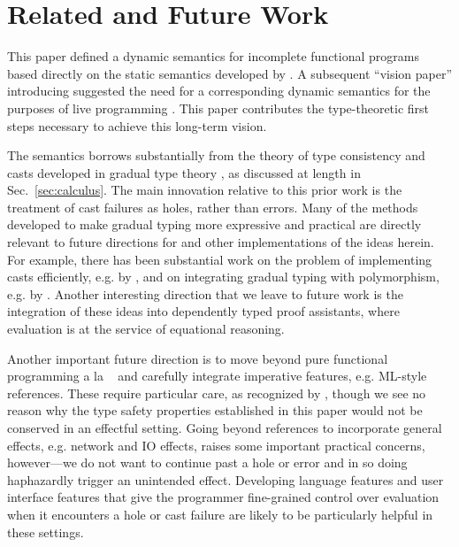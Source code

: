 \newcommand{\relatedWorkSection}{Related and Future Work}
\section{\protect\relatedWorkSection} %
\label{sec:relatedWork}

This paper defined a dynamic semantics for incomplete functional programs
based directly on the static semantics developed by \citet{popl-paper}.
A subsequent ``vision paper'' introducing \Hazel suggested the need for 
a corresponding dynamic semantics for the purposes of live programming \cite{HazelnutSNAPL}. 
This paper    
contributes the type-theoretic first steps necessary to achieve this long-term vision.

The semantics borrows substantially
from the theory of type consistency and casts developed in gradual type theory \cite{Siek06a,DBLP:conf/snapl/SiekVCB15}, as discussed
at length in Sec.~\ref{sec:calculus}. The main innovation relative to this
prior work is the treatment of cast failures as holes, rather than errors.
Many of the methods developed to make gradual typing more expressive and practical are directly relevant to future directions for \Hazel and other implementations of the ideas herein. For example, there has been substantial work on the problem of implementing casts efficiently, e.g. by \citet{herman2010space}, and on integrating gradual typing with polymorphism, e.g. by \cite{garcia2015principal}. Another interesting direction that we leave to future work is the integration of these ideas into dependently typed proof assistants, 
where evaluation is at the service of equational reasoning.

Another important future direction is to move beyond
pure functional programming a la \Elm~ and carefully integrate imperative features, e.g. ML-style references. These require particular care, as recognized by \cite{Siek06a}, though we see no reason why the type safety properties  established in this paper would not be conserved in an effectful setting. Going beyond references to incorporate general effects, e.g. network and IO effects, raises some important practical concerns, however---we do not want to continue past a hole or error and in so doing haphazardly trigger an unintended effect. Developing language features and user interface features that give the programmer fine-grained control over evaluation when it encounters a hole or cast failure are likely to be particularly helpful in these settings.

